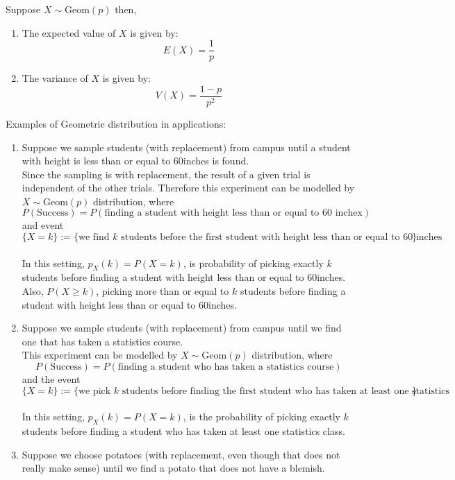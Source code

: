 \begin{thm}
    Suppose $X\sim \text{Geom}(p)$ then,
    \begin{enumerate}
        \item The expected value of $X$ is given by:
        $$E(X) = \frac{1}{p}$$
        \item The variance of $X$ is given by:
        $$V(X) = \frac{1-p}{p^2}$$
    \end{enumerate}
\end{thm}
Examples of Geometric distribution in applications:
\begin{enumerate}
    \item Suppose we sample students (with replacement) from campus until a student with height is less than or equal to 60inches is found. 
    \\
    Since the sampling is with replacement, the result of a given trial is independent of the other trials. Therefore this experiment can be modelled by $X\sim \text{Geom}(p)$ distribution, where $$P(\text{Success}) = P(\text{finding a student with height less than or equal to 60 inchex})$$ 
    and  event
    $$\{X= k \} := \{\text{we find $k$ students before the first student with height less than or equal to 60 inches}\}$$
    \\
    In this setting, $p_X(k) = P(X=k)$, is probability of picking exactly $k$ students before finding a student with height less than or equal to 60inches.  
    \\
    Also, $P(X \ge k)$, picking more than or equal to $k$ students before finding a student with height less than or equal to 60inches.
    \item  Suppose we sample students (with replacement) from campus until we find one that has taken a statistics course. 
    \\
    This experiment can be modelled by $X\sim \text{Geom}(p)$ distribution, 
    where
    $$P(\text{Success}) = P(\text{finding a student who has taken a statistics course})$$
    and the event 
    $$\{X= k \} := \{\text{we pick $k$ students before finding the first student who has taken at least one statistics class}\}$$
    \\
    In this setting, $p_X(k) = P(X=k)$,  is the probability of picking exactly $k$ students before finding a student who has taken at least one statistics class. 
    
    \item  Suppose we choose potatoes (with replacement, even though that does not really make sense) until we find a potato that does not have a blemish. 
    \\
    

\end{enumerate}
